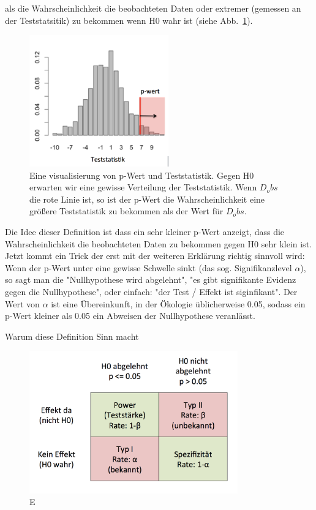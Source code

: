\documentclass[a4paper,twoside]{tufte-book}\usepackage[]{graphicx}\usepackage[]{color}
\begin{document}
als die Wahrscheinlichkeit die beobachteten Daten oder extremer (gemessen an der Teststatsitik) zu bekommen wenn H0 wahr ist (siehe Abb.~\ref{fig: teststatistik}). 


\begin{figure}[htb]
\begin{center}
\includegraphics[width = 6cm]{Teststatistik}
\caption{Eine visualisierung von p-Wert und Teststatistik. Gegen H0 erwarten wir eine gewisse Verteilung der Teststatistik. Wenn $D_obs$ die rote Linie ist, so ist der p-Wert die Wahrscheinlichkeit eine größere Teststatistik zu bekommen als der Wert für $D_obs$.}
\label{fig: teststatistik}
\end{center}
\end{figure}

Die Idee dieser Definition ist dass ein sehr kleiner p-Wert anzeigt, dass die Wahrscheinlichkeit die beobachteten Daten zu bekommen gegen H0 sehr klein ist. 
Jetzt kommt ein Trick der erst mit der weiteren Erklärung richtig sinnvoll wird: Wenn der p-Wert unter eine gewisse Schwelle sinkt (das sog. Signifikanzlevel $\alpha$), so sagt man die "Nullhypothese wird abgelehnt", "es gibt signifikante Evidenz gegen die Nullhypothese", oder einfach: "der Test / Effekt ist siginfikant". Der Wert von $\alpha$ ist eine Übereinkunft, in der Ökologie üblicherweise 0.05, sodass ein p-Wert kleiner als 0.05 ein Abweisen der Nullhypothese veranlässt.  

Warum diese Definition Sinn macht

\begin{figure}[htb]
\begin{center}
\includegraphics[width = 9cm]{ErrorTypes}
\caption{E}
\label{fig: Error Types}
\end{center}
\end{figure}
\end{document}
